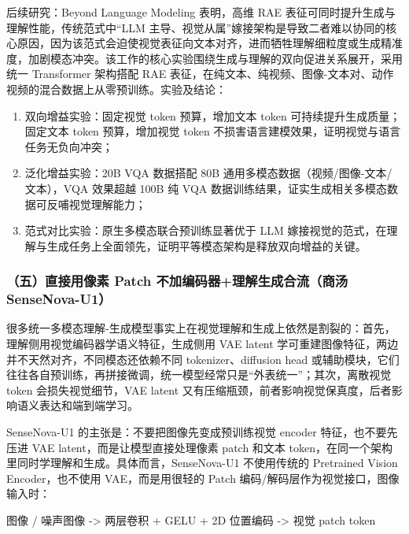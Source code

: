 后续研究：Beyond Language Modeling 表明，高维 RAE 表征可同时提升生成与理解性能，传统范式中``LLM 主导、视觉从属''嫁接架构是导致二者难以协同的核心原因，因为该范式会迫使视觉表征向文本对齐，进而牺牲理解细粒度或生成精准度，加剧模态冲突。该工作的核心实验围绕生成与理解的双向促进关系展开，采用统一 Transformer 架构搭配 RAE 表征，在纯文本、纯视频、图像-文本对、动作视频的混合数据上从零预训练。实验及结论：

\begin{enumerate}
\def\labelenumi{\arabic{enumi}.}
\tightlist
\item
  双向增益实验：固定视觉 token 预算，增加文本 token 可持续提升生成质量；固定文本 token 预算，增加视觉 token 不损害语言建模效果，证明视觉与语言任务无负向冲突；
\item
  泛化增益实验：20B VQA 数据搭配 80B 通用多模态数据（视频/图像-文本/文本），VQA 效果超越 100B 纯 VQA 数据训练结果，证实生成相关多模态数据可反哺视觉理解能力；
\item
  范式对比实验：原生多模态联合预训练显著优于 LLM 嫁接视觉的范式，在理解与生成任务上全面领先，证明平等模态架构是释放双向增益的关键。
\end{enumerate}

\hypertarget{ux4e94ux76f4ux63a5ux7528ux50cfux7d20-patch-ux4e0dux52a0ux7f16ux7801ux5668ux7406ux89e3ux751fux6210ux5408ux6d41ux5546ux6c64-sensenova-u1}{%
\subsubsection{（五）直接用像素 Patch 不加编码器+理解生成合流（商汤 SenseNova-U1）}\label{ux4e94ux76f4ux63a5ux7528ux50cfux7d20-patch-ux4e0dux52a0ux7f16ux7801ux5668ux7406ux89e3ux751fux6210ux5408ux6d41ux5546ux6c64-sensenova-u1}}

很多统一多模态理解-生成模型事实上在视觉理解和生成上依然是割裂的：首先，理解侧用视觉编码器学语义特征，生成侧用 VAE latent 学可重建图像特征，两边并不天然对齐，不同模态还依赖不同 tokenizer、diffusion head 或辅助模块，它们往往各自预训练，再拼接微调，统一模型经常只是``外表统一''；其次，离散视觉 token 会损失视觉细节，VAE latent 又有压缩瓶颈，前者影响视觉保真度，后者影响语义表达和端到端学习。

SenseNova-U1 的主张是：不要把图像先变成预训练视觉 encoder 特征，也不要先压进 VAE latent，而是让模型直接处理像素 patch 和文本 token，在同一个架构里同时学理解和生成。具体而言，SenseNova-U1 不使用传统的 Pretrained Vision Encoder，也不使用 VAE，而是用很轻的 Patch 编码/解码层作为视觉接口，图像输入时：

图像 / 噪声图像 -\textgreater{} 两层卷积 + GELU + 2D 位置编码 -\textgreater{} 视觉 patch token

